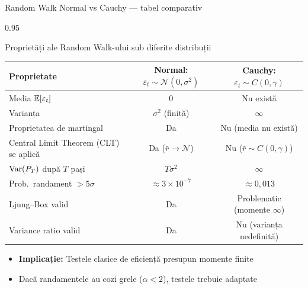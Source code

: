 \documentclass[9pt, aspectratio=169, t]{beamer}
\begin{document}
\begin{frame}[shrink=15]{Random Walk Normal vs Cauchy --- tabel comparativ}
\begin{cminipage}{0.95\textwidth}
\begin{block}{Proprietăți ale Random Walk-ului sub diferite distribuții}
\renewcommand{\arraystretch}{1.2}
\begin{center}
\footnotesize
\begin{tabular}{lcc}
\toprule
\textbf{Proprietate} & \textbf{Normal: $\varepsilon_t \sim \mathcal{N}(0,\sigma^2)$} & \textbf{Cauchy: $\varepsilon_t \sim C(0,\gamma)$} \\
\midrule
Media $\mathbb{E}[\varepsilon_t]$ & $0$ & Nu există \\
Varianța & $\sigma^2$ (finită) & $\infty$ \\
Proprietatea de martingal & Da & Nu (media nu există) \\
Central Limit Theorem (CLT) se aplică & Da ($\bar{r} \to \mathcal{N}$) & Nu ($\bar{r} \sim C(0,\gamma)$) \\
$\text{Var}(P_T)$ după $T$ pași & $T\sigma^2$ & $\infty$ \\
Prob.\ randament $> 5\sigma$ & $\approx 3 \times 10^{-7}$ & $\approx 0{,}013$ \\
Ljung--Box valid & Da & Problematic (momente $\infty$) \\
Variance ratio valid & Da & Nu (varianța nedefinită) \\
\bottomrule
\end{tabular}
\end{center}
\end{block}

\vspace{0.1cm}
\begin{itemize}\setlength{\itemsep}{0pt}
    \item \textbf{Implicație:} Testele clasice de eficiență presupun momente finite
    \item Dacă randamentele au cozi grele ($\alpha < 2$), testele trebuie adaptate
\end{itemize}
\end{cminipage}
\end{frame}
\end{document}
